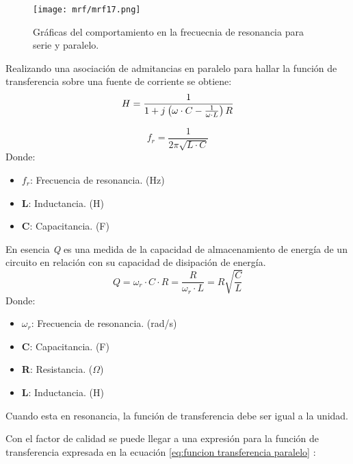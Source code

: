 \documentclass[
	12pt, %
	fleqn, %
	a4paper, %
	oneside, %
]{LegrandOrangeBook}
\begin{document}
\begin{figure}[H]
\centering
\texttt{[image: mrf/mrf17.png]}
\caption{Gráficas del comportamiento en la frecuecnia de resonancia para serie y paralelo.}
\end{figure}
\begin{definition}
Realizando una asociación de admitancias en paralelo para hallar la función de transferencia sobre una fuente de corriente se obtiene:
\begin{equation}
H=\frac{1}{1+{j\mkern1mu}\left(\omega\cdot C-\frac{1}{\omega\cdot L}\right)R}
\label{eq:funcion transferencia paralelo}
\end{equation}
\begin{definition}
\begin{equation}
f_r=\frac{1}{2\pi\sqrt{L\cdot C}}
\label{eq:frec resonancia}
\end{equation}
Donde:
\begin{itemize}
\item $f_r$: Frecuencia de resonancia. (Hz)
\item \textbf{L}: Inductancia. (H)
\item \textbf{C}: Capacitancia. (F)
\end{itemize}
\end{definition}
\end{definition}
\begin{definition}
En esencia \textit{Q} es una medida de la capacidad de almacenamiento de energía de un circuito en relación con su capacidad de disipación de energía.
\begin{equation}
Q=\omega_r\cdot C\cdot R=\frac{R}{\omega_r\cdot L}=R\sqrt{\frac{C}{L}}
\label{eq:factor calidad paralelo}
\end{equation}
Donde:
\begin{itemize}
\item $\omega_r$: Frecuencia de resonancia. (rad/s)
\item \textbf{C}: Capacitancia. (F)
\item \textbf{R}: Resistancia. ($\Omega$)
\item \textbf{L}: Inductancia. (H)
\end{itemize}
\end{definition}
\begin{remark}
Cuando esta en resonancia, la función de transferencia debe ser igual a la unidad.
\end{remark}
Con el factor de calidad se puede llegar a una expresión para la función de transferencia expresada en la ecuación \ref{eq:funcion transferencia paralelo} :
\end{document}
